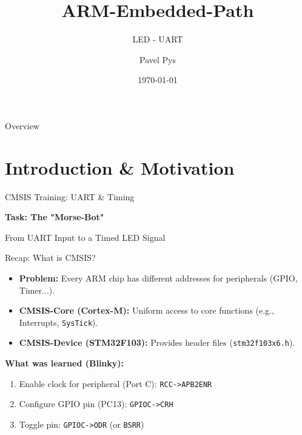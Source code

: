\documentclass{beamer}
\title{ARM-Embedded-Path}
\subtitle{LED - UART}
\author{Pavel Pys}
\date{\today}
\begin{document}
\begin{frame}{}
	\maketitle
\end{frame}
\begin{frame}{Overview}
	\tableofcontents
\end{frame}

\section{Introduction \& Motivation}

\begin{frame}{CMSIS Training: UART \& Timing}
	\begin{center}
		\Large\textbf{Task: The "Morse-Bot"}
		\medskip
		
		\normalsize From UART Input to a Timed LED Signal
	\end{center}
\end{frame}

\begin{frame}{Recap: What is CMSIS?}
	\begin{itemize}
		\item \textbf{Problem:} Every ARM chip has different addresses for peripherals (GPIO, Timer...).
		\item \textbf{CMSIS-Core (Cortex-M):} Uniform access to core functions (e.g., Interrupts, \texttt{SysTick}).
		\item \textbf{CMSIS-Device (STM32F103):} Provides header files (\texttt{stm32f103x6.h}).
	\end{itemize}
	
	\medskip
	\textbf{What was learned (Blinky):}
	\begin{enumerate}
		\item Enable clock for peripheral (Port C): \texttt{RCC->APB2ENR}
		\item Configure GPIO pin (PC13): \texttt{GPIOC->CRH}
		\item Toggle pin: \texttt{GPIOC->ODR} (or \texttt{BSRR})
	\end{enumerate}
\end{frame}
\end{document}
